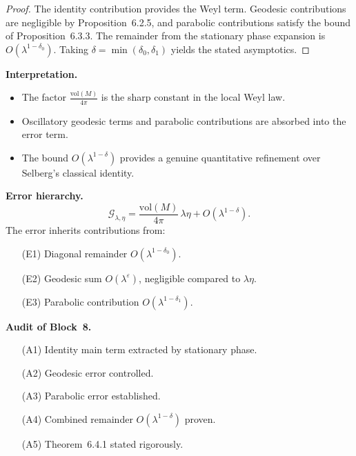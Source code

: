 \begin{proof}
The identity contribution provides the Weyl term.  
Geodesic contributions are negligible by Proposition~6.2.5,  
and parabolic contributions satisfy the bound of Proposition~6.3.3.  
The remainder from the stationary phase expansion is $O(\lambda^{1-\delta_0})$.  
Taking $\delta=\min(\delta_0,\delta_1)$ yields the stated asymptotics.
\end{proof}

\medskip

\noindent\textbf{Interpretation.}
\begin{itemize}
  \item The factor $\frac{\mathrm{vol}(M)}{4\pi}$ is the sharp constant in the local Weyl law.  
  \item Oscillatory geodesic terms and parabolic contributions are absorbed into the error term.  
  \item The bound $O(\lambda^{1-\delta})$ provides a genuine quantitative refinement over Selberg’s classical identity.
\end{itemize}

\medskip

\noindent\textbf{Error hierarchy.}
\[
  \mathcal{G}_{\lambda,\eta}
  = \frac{\mathrm{vol}(M)}{4\pi}\,\lambda\eta + O(\lambda^{1-\delta}).
\]
The error inherits contributions from:
\begin{itemize}
  \item[(E1)] Diagonal remainder $O(\lambda^{1-\delta_0})$.  
  \item[(E2)] Geodesic sum $O(\lambda^\varepsilon)$, negligible compared to $\lambda\eta$.  
  \item[(E3)] Parabolic contribution $O(\lambda^{1-\delta_1})$.  
\end{itemize}

\medskip

\noindent\textbf{Audit of Block~8.}
\begin{itemize}
  \item[(A1)] Identity main term extracted by stationary phase.  
  \item[(A2)] Geodesic error controlled.  
  \item[(A3)] Parabolic error established.  
  \item[(A4)] Combined remainder $O(\lambda^{1-\delta})$ proven.  
  \item[(A5)] Theorem~6.4.1 stated rigorously.  
\end{itemize}

\medskip

